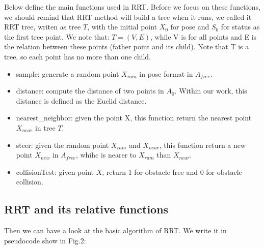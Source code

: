 \documentclass[letterpaper, 10 pt, conference]{ieeeconf}  %
\begin{document}
Below define the main functions used in RRT. Before we focus on these functions, we should remind that RRT method will build a tree when it runs, we called it RRT tree, writen as tree $T$, with the initial point $X_{0}$ for pose and  $S_{0}$ for status as the first tree point. We note that: $T = (V, E)$, while V is for all points and E is the relation between these points (father point and its child). Note that T is a tree, so each point has no more than one child.

\begin{itemize}

\item sample:  generate a random point $X_{ram}$ in pose format in $A_{free}$.

\item distance:  compute the distance of two points in $A_{0}$. Within our work, this distance is defined as the Euclid distance.

\item nearest\_neighbor: given the point X, this function return the nearest point $X_{near}$ in tree $T$.

\item steer: given the random point $X_{ram}$ and $X_{near}$, this function return a new point $X_{new}$ in $A_{free}$, whihc is nearer to $X_{ram}$ than $X_{near}$.

\item collisionTest: given point $X$, return 1 for obstacle free and 0 for obstacle collision. 

\end{itemize}

\subsection{RRT and its relative functions}

Then we can have a look at the basic algorithm of RRT. We write it in pseudocode show in Fig.2:
\end{document}

